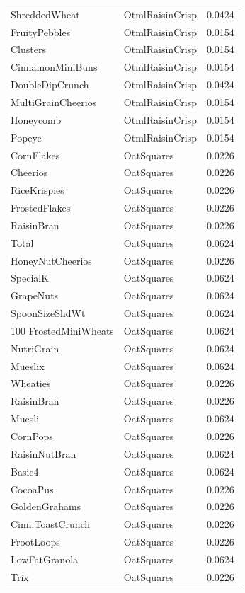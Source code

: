 \begin{longtable}{llr}
ShreddedWheat & OtmlRaisinCrisp & 0.0424 \\
FruityPebbles & OtmlRaisinCrisp & 0.0154 \\
Clusters & OtmlRaisinCrisp & 0.0154 \\
CinnamonMiniBuns & OtmlRaisinCrisp & 0.0154 \\
DoubleDipCrunch & OtmlRaisinCrisp & 0.0424 \\
MultiGrainCheerios & OtmlRaisinCrisp & 0.0154 \\
Honeycomb & OtmlRaisinCrisp & 0.0154 \\
Popeye & OtmlRaisinCrisp & 0.0154 \\
CornFlakes & OatSquares & 0.0226 \\
Cheerios & OatSquares & 0.0226 \\
RiceKrispies & OatSquares & 0.0226 \\
FrostedFlakes & OatSquares & 0.0226 \\
RaisinBran & OatSquares & 0.0226 \\
Total & OatSquares & 0.0624 \\
HoneyNutCheerios & OatSquares & 0.0226 \\
SpecialK & OatSquares & 0.0624 \\
GrapeNuts & OatSquares & 0.0624 \\
SpoonSizeShdWt & OatSquares & 0.0624 \\
100%
FrostedMiniWheats & OatSquares & 0.0624 \\
NutriGrain & OatSquares & 0.0624 \\
Mueslix & OatSquares & 0.0624 \\
Wheaties & OatSquares & 0.0226 \\
RaisinBran & OatSquares & 0.0226 \\
Muesli & OatSquares & 0.0624 \\
CornPops & OatSquares & 0.0226 \\
RaisinNutBran & OatSquares & 0.0624 \\
Basic4 & OatSquares & 0.0624 \\
CocoaPus & OatSquares & 0.0226 \\
GoldenGrahams & OatSquares & 0.0226 \\
Cinn.ToastCrunch & OatSquares & 0.0226 \\
FrootLoops & OatSquares & 0.0226 \\
LowFatGranola & OatSquares & 0.0624 \\
Trix & OatSquares & 0.0226 \\

\end{longtable}
